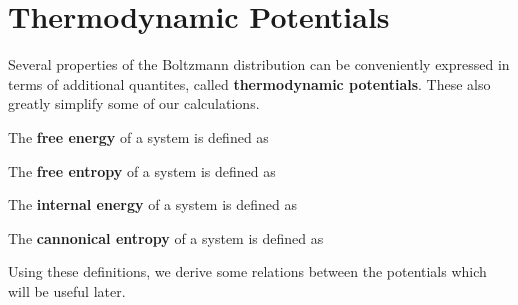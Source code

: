 \documentclass[letterpaper,english,10pt]{article}
\begin{document}
\section{Thermodynamic Potentials}
Several properties of the Boltzmann distribution can be conveniently expressed in terms of additional quantites, called \textbf{thermodynamic potentials}. These also greatly simplify some of our calculations. 
\begin{defn}
The \textbf{free energy} of a system is defined as 
\end{defn}
\begin{defn}
The \textbf{free entropy} of a system is defined as 
\end{defn}
\begin{defn}
The \textbf{internal energy} of a system is defined as 
\end{defn}
\begin{defn}
The \textbf{cannonical entropy} of a system is defined as 
\end{defn}
Using these definitions, we derive some relations between the potentials which will be useful later. 
\end{document}
